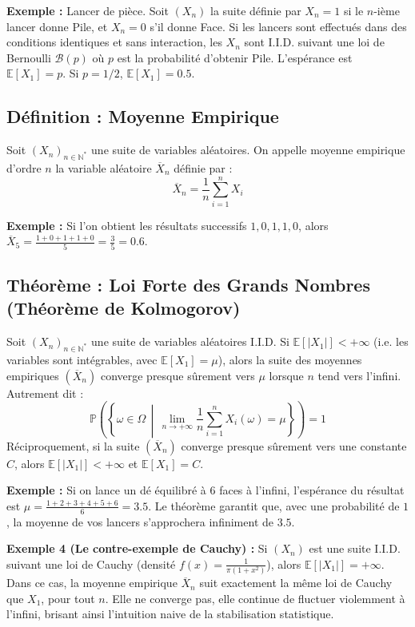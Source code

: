 \documentclass[11pt,a4paper]{article}
\begin{document}
\textbf{Exemple :} Lancer de pièce. Soit $(X_n)$ la suite définie par $X_n = 1$ si le $n$-ième lancer donne Pile, et $X_n = 0$ s'il donne Face. Si les lancers sont effectués dans des conditions identiques et sans interaction, les $X_n$ sont I.I.D. suivant une loi de Bernoulli $\mathcal{B}(p)$ où $p$ est la probabilité d'obtenir Pile. L'espérance est $\mathbb{E}[X_1] = p$. Si $p = 1/2$, $\mathbb{E}[X_1] = 0.5$.

\subsection{Définition : Moyenne Empirique}
Soit $(X_n)_{n \in \mathbb{N}^*}$ une suite de variables aléatoires. On appelle moyenne empirique d'ordre $n$ la variable aléatoire $\overline{X}_n$ définie par :
$$ \overline{X}_n = \frac{1}{n} \sum_{i=1}^n X_i $$

\textbf{Exemple :} Si l'on obtient les résultats successifs $1, 0, 1, 1, 0$, alors $\overline{X}_5 = \frac{1+0+1+1+0}{5} = \frac{3}{5} = 0.6$.

\subsection{Théorème : Loi Forte des Grands Nombres (Théorème de Kolmogorov)}
Soit $(X_n)_{n \in \mathbb{N}^*}$ une suite de variables aléatoires I.I.D.
Si $\mathbb{E}[|X_1|] < +\infty$ (i.e. les variables sont intégrables, avec $\mathbb{E}[X_1] = \mu$), alors la suite des moyennes empiriques $(\overline{X}_n)$ converge presque sûrement vers $\mu$ lorsque $n$ tend vers l'infini.
Autrement dit :
$$ \mathbb{P} \left( \left\{ \omega \in \Omega \, \middle| \, \lim_{n \to +\infty} \frac{1}{n} \sum_{i=1}^n X_i(\omega) = \mu \right\} \right) = 1 $$
Réciproquement, si la suite $(\overline{X}_n)$ converge presque sûrement vers une constante $C$, alors $\mathbb{E}[|X_1|] < +\infty$ et $\mathbb{E}[X_1] = C$.

\textbf{Exemple :} Si on lance un dé équilibré à 6 faces à l'infini, l'espérance du résultat est $\mu = \frac{1+2+3+4+5+6}{6} = 3.5$. Le théorème garantit que, avec une probabilité de $1$, la moyenne de vos lancers s'approchera infiniment de $3.5$.

\textbf{Exemple 4 (Le contre-exemple de Cauchy) :} Si $(X_n)$ est une suite I.I.D. suivant une loi de Cauchy (densité $f(x) = \frac{1}{\pi(1+x^2)}$), alors $\mathbb{E}[|X_1|] = +\infty$. Dans ce cas, la moyenne empirique $\overline{X}_n$ suit exactement la même loi de Cauchy que $X_1$, pour tout $n$. Elle ne converge pas, elle continue de fluctuer violemment à l'infini, brisant ainsi l'intuition naive de la stabilisation statistique.
\end{document}

